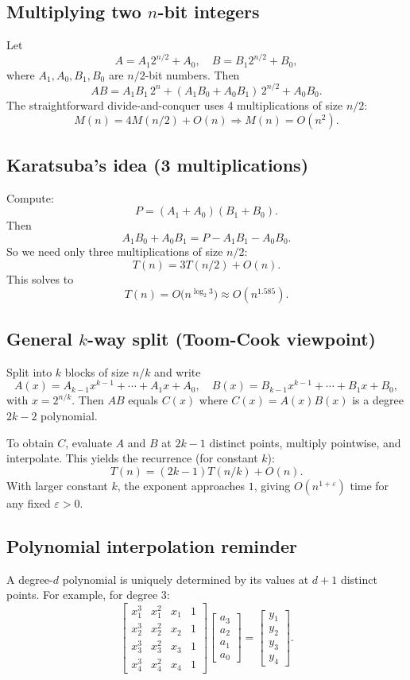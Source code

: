 \documentclass[11pt]{article}
\begin{document}
{{\subsection*{Multiplying two $n$-bit integers}
Let
\[
A = A_1 2^{n/2} + A_0, \quad B = B_1 2^{n/2} + B_0,
\]
where $A_1,A_0,B_1,B_0$ are $n/2$-bit numbers. Then
\[
AB = A_1B_1\,2^n + (A_1B_0 + A_0B_1)\,2^{n/2} + A_0B_0.
\]
The straightforward divide-and-conquer uses 4 multiplications of size $n/2$:
\[
M(n) = 4M(n/2) + O(n) \Rightarrow M(n) = O(n^2).
\]

\subsection*{Karatsuba's idea (3 multiplications)}
Compute:
\[
P = (A_1 + A_0)(B_1 + B_0).
\]
Then
\[
A_1B_0 + A_0B_1 = P - A_1B_1 - A_0B_0.
\]
So we need only three multiplications of size $n/2$:
\[
T(n) = 3T(n/2) + O(n).
\]
This solves to
\[
T(n) = O\bigl(n^{\log_2 3}\bigr) \approx O(n^{1.585}).
\]

\subsection*{General $k$-way split (Toom-Cook viewpoint)}
Split into $k$ blocks of size $n/k$ and write
\[
A(x) = A_{k-1}x^{k-1} + \cdots + A_1 x + A_0, \quad
B(x) = B_{k-1}x^{k-1} + \cdots + B_1 x + B_0,
\]
with $x = 2^{n/k}$. Then $AB$ equals $C(x)$ where $C(x) = A(x)B(x)$ is a degree $2k-2$ polynomial.

To obtain $C$, evaluate $A$ and $B$ at $2k-1$ distinct points, multiply pointwise, and interpolate.
This yields the recurrence (for constant $k$):
\[
T(n) = (2k-1)T(n/k) + O(n).
\]
With larger constant $k$, the exponent approaches $1$, giving $O(n^{1+\varepsilon})$ time for any
fixed $\varepsilon>0$.

\subsection*{Polynomial interpolation reminder}
A degree-$d$ polynomial is uniquely determined by its values at $d+1$ distinct points. For example,
for degree 3:
\[
\begin{bmatrix}
x_1^3 & x_1^2 & x_1 & 1 \\
x_2^3 & x_2^2 & x_2 & 1 \\
x_3^3 & x_3^2 & x_3 & 1 \\
x_4^3 & x_4^2 & x_4 & 1
\end{bmatrix}
\begin{bmatrix}a_3\\a_2\\a_1\\a_0\end{bmatrix}
=
\begin{bmatrix}y_1\\y_2\\y_3\\y_4\end{bmatrix}.
\]

}}
\end{document}
